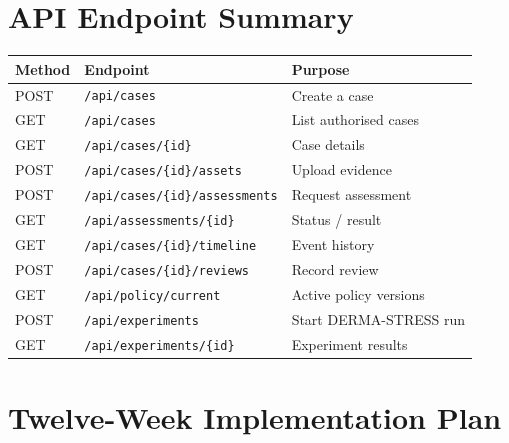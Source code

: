 \documentclass[conference]{IEEEtran}
\newcommand{\1}{\mathbf{1}}
\begin{document}
\section{API Endpoint Summary}
\label{app:api}

\begin{table}[H]
  \centering
  \small
  \renewcommand{\arraystretch}{1.15}
  \begin{tabular}{llp{3.6cm}}
    \toprule
    \textbf{Method} & \textbf{Endpoint} & \textbf{Purpose} \\
    \midrule
    POST & \texttt{/api/cases} & Create a case \\
    GET  & \texttt{/api/cases} & List authorised cases \\
    GET  & \texttt{/api/cases/\{id\}} & Case details \\
    POST & \texttt{/api/cases/\{id\}/assets} & Upload evidence \\
    POST & \texttt{/api/cases/\{id\}/assessments} & Request assessment \\
    GET  & \texttt{/api/assessments/\{id\}} & Status / result \\
    GET  & \texttt{/api/cases/\{id\}/timeline} & Event history \\
    POST & \texttt{/api/cases/\{id\}/reviews} & Record review \\
    GET  & \texttt{/api/policy/current} & Active policy versions \\
    POST & \texttt{/api/experiments} & Start DERMA-STRESS run \\
    GET  & \texttt{/api/experiments/\{id\}} & Experiment results \\
    \bottomrule
  \end{tabular}
\end{table}

\section{Twelve-Week Implementation Plan}
\label{app:plan}
\end{document}
